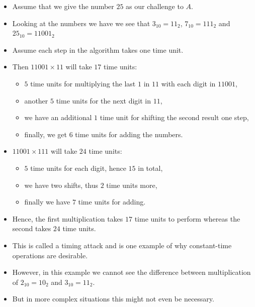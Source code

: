\begin{frame}
  \begin{itemize}
    \item Assume that we give the number \(25\) as our challenge to \(A\).
    \item Looking at the numbers we have we see that \(3_{10} = 11_2\), 
      \(7_{10} = 111_2\) and \(25_{10} = 11001_2\)

    \item Assume each step in the algorithm takes one time unit.

    \item Then \(11001\times 11\) will take \(17\) time units:
      \begin{itemize}
        \item \(5\) time units for multiplying the last \(1\) in \(11\) with 
          each digit in \(11001\),

        \item another \(5\) time units for the next digit in \(11\),

        \item we have an additional \(1\) time unit for shifting the second 
          result one step,

        \item finally, we get \(6\) time units for adding the numbers.
      \end{itemize}

    \item \(11001\times 111\) will take \(24\) time units:
      \begin{itemize}
        \item \(5\) time units for each digit, hence \(15\) in total,

        \item we have two shifts, thus \(2\) time units more,

        \item finally we have \(7\) time units for adding.
      \end{itemize}
  \end{itemize}
\end{frame}

\begin{frame}
  \begin{itemize}
    \item Hence, the first multiplication takes \(17\) time units to perform 
      whereas the second takes \(24\) time units.

    \item This is called a timing attack and is one example of why 
      constant-time operations are desirable.

    \item However, in this example we cannot see the difference between 
      multiplication of \(2_{10} = 10_2\) and \(3_{10} = 11_2\).

    \item But in more complex situations this might not even be necessary.

  \end{itemize}
\end{frame}


